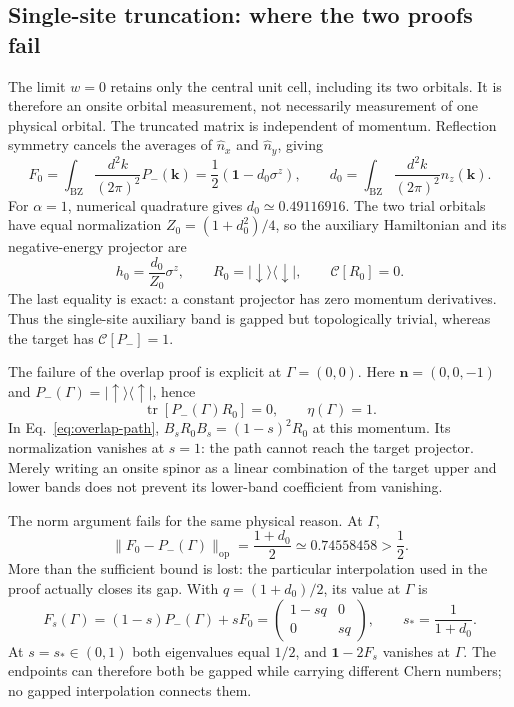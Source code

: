 \documentclass[aps,prb,onecolumn,nofootinbib,superscriptaddress]{revtex4-2}
\newcommand{\id}{\mathbf{1}}
\newcommand{\tr}{\operatorname{tr}}
\newcommand{\bk}{\boldsymbol k}
\newcommand{\C}{\mathcal C}
\newcommand{\BZ}{\mathrm{BZ}}
\begin{document}
\subsection{Single-site truncation: where the two proofs fail}
\label{sec:single-site}

The limit $w=0$ retains only the central unit cell, including its two orbitals. It is therefore an onsite orbital measurement, not necessarily measurement of one physical orbital. The truncated matrix is independent of momentum. Reflection symmetry cancels the averages of $\widehat n_x$ and $\widehat n_y$, giving
\begin{equation}
 F_0=\int_{\BZ}\frac{d^2k}{(2\pi)^2}P_-(\bk)
 =\frac12(\id-d_0\sigma^z),\qquad
 d_0=\int_{\BZ}\frac{d^2k}{(2\pi)^2}\widehat n_z(\bk).
 \label{eq:onsite-frame}
\end{equation}
For $\alpha=1$, numerical quadrature gives $d_0\simeq0.49116916$. The two trial orbitals have equal normalization $Z_0=(1+d_0^2)/4$, so the auxiliary Hamiltonian and its negative-energy projector are
\begin{equation}
 h_0=\frac{d_0}{Z_0}\sigma^z,\qquad
 R_0=|\downarrow\rangle\langle\downarrow|,\qquad
 \C[R_0]=0.
 \label{eq:onsite-projector}
\end{equation}
The last equality is exact: a constant projector has zero momentum derivatives. Thus the single-site auxiliary band is gapped but topologically trivial, whereas the target has $\C[P_-]=1$.

The failure of the overlap proof is explicit at $\Gamma=(0,0)$. Here $\boldsymbol n=(0,0,-1)$ and $P_-(\Gamma)=|\uparrow\rangle\langle\uparrow|$, hence
\begin{equation}
 \tr[P_-(\Gamma)R_0]=0,\qquad \eta(\Gamma)=1.
\end{equation}
In Eq.~\eqref{eq:overlap-path}, $B_sR_0B_s=(1-s)^2R_0$ at this momentum. Its normalization vanishes at $s=1$: the path cannot reach the target projector. Merely writing an onsite spinor as a linear combination of the target upper and lower bands does not prevent its lower-band coefficient from vanishing.

The norm argument fails for the same physical reason. At $\Gamma$,
\begin{equation}
 \|F_0-P_-(\Gamma)\|_{\mathrm{op}}
 =\frac{1+d_0}{2}\simeq0.74558458>\frac12.
\end{equation}
More than the sufficient bound is lost: the particular interpolation used in the proof actually closes its gap. With $q=(1+d_0)/2$, its value at $\Gamma$ is
\begin{equation}
 F_s(\Gamma)=(1-s)P_-(\Gamma)+sF_0
 =\begin{pmatrix}1-sq&0\\0&sq\end{pmatrix},\qquad
 s_*=\frac{1}{1+d_0}.
 \label{eq:onsite-crossing}
\end{equation}
At $s=s_*\in(0,1)$ both eigenvalues equal $1/2$, and $\id-2F_s$ vanishes at $\Gamma$. The endpoints can therefore both be gapped while carrying different Chern numbers; no gapped interpolation connects them.
\end{document}
